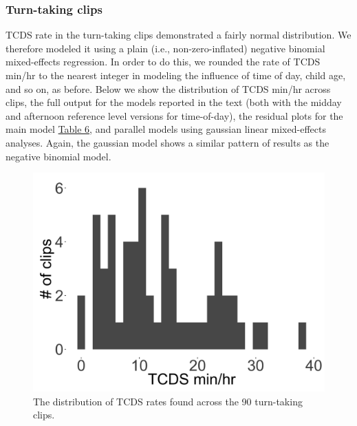 \documentclass[floatsintext,man]{apa6}
\theoremstyle{definition}
\theoremstyle{definition}
\theoremstyle{definition}
\theoremstyle{remark}
\begin{document}
\subsubsection{Turn-taking clips}\label{models-tcds-turntaking}

TCDS rate in the turn-taking clips demonstrated a fairly normal
distribution. We therefore modeled it using a plain (i.e.,
non-zero-inflated) negative binomial mixed-effects regression. In order
to do this, we rounded the rate of TCDS min/hr to the nearest integer in
modeling the influence of time of day, child age, and so on, as before.
Below we show the distribution of TCDS min/hr across clips, the full
output for the models reported in the text (both with the midday and
afternoon reference level versions for time-of-day), the residual plots
for the main model \protect\hyperlink{tab6}{Table 6}, and parallel
models using gaussian linear mixed-effects analyses. Again, the gaussian
model shows a similar pattern of results as the negative binomial model.

\begin{figure}

{\centering \includegraphics[width=0.4\linewidth]{www/TCDS_turntaking_distribution} 

}

\caption{The distribution of TCDS rates found across the 90 turn-taking clips.}\label{fig:fig4}
\end{figure}
\end{document}
